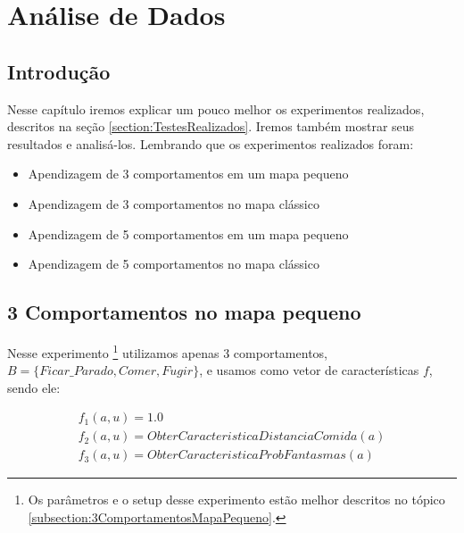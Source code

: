 


\chapter{Análise de Dados} \label{chap:Resultados}



\section{Introdução}

Nesse capítulo iremos explicar um pouco melhor os experimentos realizados, descritos na seção \ref{section:TestesRealizados}. Iremos também mostrar seus resultados e analisá-los. Lembrando que os experimentos realizados foram:

\begin{itemize}
	\item Apendizagem de 3 comportamentos em um mapa pequeno
	\item Apendizagem de 3 comportamentos no mapa clássico
	\item Apendizagem de 5 comportamentos em um mapa pequeno
	\item Apendizagem de 5 comportamentos no mapa clássico
\end{itemize}

\section{3 Comportamentos no mapa pequeno}

Nesse experimento%
\footnote{Os parâmetros e o setup desse experimento estão melhor descritos no tópico \ref{subsection:3ComportamentosMapaPequeno}.%
} utilizamos apenas 3 comportamentos, $ B = \{Ficar\_Parado, Comer, Fugir\} $, e usamos como vetor de características $ f $, sendo ele:

\begin{equation}
	\begin{array}{l}
		f_1 \left( a, u \right) = 1.0 \\
		f_2 \left( a, u \right) = ObterCaracteristicaDistanciaComida \left( a \right) \\
		f_3 \left( a, u \right) = ObterCaracteristicaProbFantasmas \left( a \right)
	\end{array}
\end{equation}

